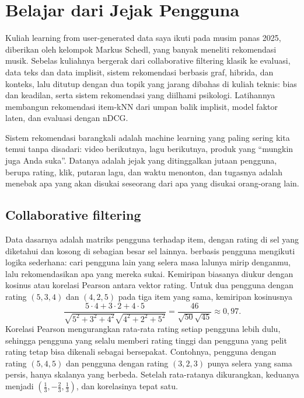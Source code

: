 \chapter{Belajar dari Jejak Pengguna}
\label{ch:rekomendasi}

Kuliah learning from user-generated data saya ikuti pada musim panas 2025, diberikan oleh kelompok
Markus Schedl, yang banyak meneliti rekomendasi musik. Sebelas kuliahnya bergerak dari collaborative
filtering klasik ke evaluasi, data teks dan data implisit, sistem rekomendasi berbasis graf, hibrida,
dan konteks, lalu ditutup dengan dua topik yang jarang dibahas di kuliah teknis: bias dan keadilan, serta
sistem rekomendasi yang diilhami psikologi. Latihannya membangun rekomendasi item-kNN dari umpan balik
implisit, model faktor laten, dan evaluasi dengan nDCG.

Sistem rekomendasi barangkali adalah machine learning yang paling sering kita temui tanpa disadari:
video berikutnya, lagu berikutnya, produk yang ``mungkin juga Anda suka''. Datanya adalah jejak yang
ditinggalkan jutaan pengguna, berupa rating, klik, putaran lagu, dan waktu menonton, dan tugasnya adalah
menebak apa yang akan disukai seseorang dari apa yang disukai orang-orang lain.

\section{Collaborative filtering}

Data dasarnya adalah matriks pengguna terhadap item, dengan rating di sel yang diketahui dan kosong di
sebagian besar sel lainnya.  berbasis pengguna mengikuti logika sederhana:
cari pengguna lain yang selera masa lalunya mirip denganmu, lalu rekomendasikan apa yang mereka sukai.
Kemiripan biasanya diukur dengan kosinus atau korelasi Pearson antara vektor rating. Untuk dua pengguna
dengan rating $(5,3,4)$ dan $(4,2,5)$ pada tiga item yang sama, kemiripan kosinusnya
\begin{equation}
\frac{5\cdot4+3\cdot2+4\cdot5}{\sqrt{5^2+3^2+4^2}\sqrt{4^2+2^2+5^2}}=\frac{46}{\sqrt{50}\sqrt{45}}\approx0{,}97.
\end{equation}
Korelasi Pearson mengurangkan rata-rata rating setiap pengguna lebih dulu, sehingga pengguna yang selalu
memberi rating tinggi dan pengguna yang pelit rating tetap bisa dikenali sebagai bersepakat. Contohnya, pengguna
dengan rating $(5,4,5)$ dan pengguna dengan rating $(3,2,3)$ punya selera yang sama persis, hanya skalanya yang berbeda.
Setelah rata-ratanya dikurangkan, keduanya menjadi $(\tfrac13,-\tfrac23,\tfrac13)$, dan korelasinya tepat satu.

